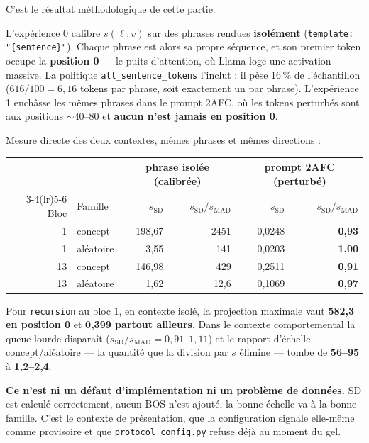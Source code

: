 \documentclass[a4paper,10pt]{article}
\newcommand{\pc}[1]{#1\,\%}
\begin{document}
C'est le résultat méthodologique de cette partie.

L'expérience 0 calibre $s(\ell,v)$ sur des phrases rendues \textbf{isolément}
(\texttt{template: "\{sentence\}"}). Chaque phrase est alors sa propre séquence, et son premier token
occupe la \textbf{position 0} --- le puits d'attention, où Llama loge une activation massive. La
politique \texttt{all\_sentence\_tokens} l'inclut : il pèse \pc{16} de l'échantillon
($616/100 = 6{,}16$ tokens par phrase, soit exactement un par phrase). L'expérience 1 enchâsse les
mêmes phrases dans le prompt 2AFC, où les tokens perturbés sont aux positions ${\sim}40$--$80$ et
\textbf{aucun n'est jamais en position 0}.

Mesure directe des deux contextes, mêmes phrases et mêmes directions :

\begin{center}\small
\begin{tabular}{rlrrrr}
\toprule
& & \multicolumn{2}{c}{phrase isolée (calibrée)} & \multicolumn{2}{c}{prompt 2AFC (perturbé)} \\
\cmidrule(lr){3-4}\cmidrule(lr){5-6}
Bloc & Famille & $s_{\mathrm{SD}}$ & $s_{\mathrm{SD}}/s_{\mathrm{MAD}}$ & $s_{\mathrm{SD}}$ & $s_{\mathrm{SD}}/s_{\mathrm{MAD}}$ \\
\midrule
1  & concept   & 198,67 & 2451 & 0,0248 & \textbf{0,93} \\
1  & aléatoire & 3,55   & 141  & 0,0203 & \textbf{1,00} \\
13 & concept   & 146,98 & 429  & 0,2511 & \textbf{0,91} \\
13 & aléatoire & 1,62   & 12,6 & 0,1069 & \textbf{0,97} \\
\bottomrule
\end{tabular}
\end{center}

Pour \texttt{recursion} au bloc 1, en contexte isolé, la projection maximale vaut \textbf{582,3 en
position 0} et \textbf{0,399 partout ailleurs}. Dans le contexte comportemental la queue lourde
disparaît ($s_{\mathrm{SD}}/s_{\mathrm{MAD}} = 0{,}91$--$1{,}11$) et le rapport d'échelle
concept/aléatoire --- la quantité que la division par $s$ élimine --- tombe de \textbf{56--95} à
\textbf{1,2--2,4}.

\textbf{Ce n'est ni un défaut d'implémentation ni un problème de données.} SD est calculé
correctement, aucun BOS n'est ajouté, la bonne échelle va à la bonne famille. C'est le contexte de
présentation, que la configuration signale elle-même comme provisoire et que
\texttt{protocol\_config.py} refuse déjà au moment du gel.
\end{document}
